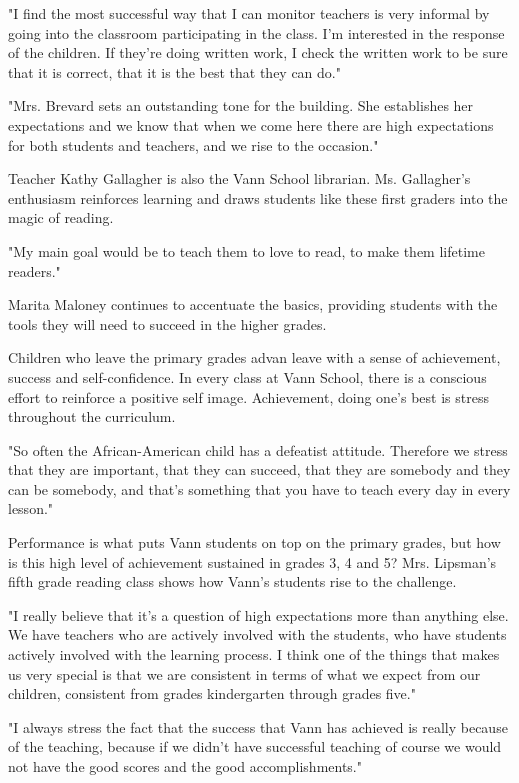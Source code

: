 "I find the most successful way that I can monitor teachers is very informal by going into the classroom participating in the class. I'm interested in the response of the children. If they're doing written work, I check the written work to be sure that it is correct, that it is the best that they can do."

"Mrs. Brevard sets an outstanding tone for the building. She establishes her expectations and we know that when we come here there are high expectations for both students and teachers, and we rise to the occasion."

Teacher Kathy Gallagher is also the Vann School librarian. Ms. Gallagher's enthusiasm reinforces learning and draws students like these first graders into the magic of reading.

"My main goal would be to teach them to love to read, to make them lifetime readers."

Marita Maloney continues to accentuate the basics, providing students with the tools they will need to succeed in the higher grades.

Children who leave the primary grades advan leave with a sense of achievement, success and self-confidence. In every class at Vann School, there is a conscious effort to reinforce a positive self image. Achievement, doing one's best is stress throughout the curriculum.

"So often the African-American child has a defeatist attitude. Therefore we stress that they are important, that they can succeed, that they are somebody and they can be somebody, and that's something that you have to teach every day in every lesson."

Performance is what puts Vann students on top on the primary grades, but how is this high level of achievement sustained in grades 3, 4 and 5? Mrs. Lipsman's fifth grade reading class shows how Vann's students rise to the challenge.

"I really believe that it's a question of high expectations more than anything else. We have teachers who are actively involved with the students, who have students actively involved with the learning process. I think one of the things that makes us very special is that we are consistent in terms of what we expect from our children, consistent from grades kindergarten through grades five."

"I always stress the fact that the success that Vann has achieved is really because of the teaching, because if we didn't have successful teaching of course we would not have the good scores and the good accomplishments."

